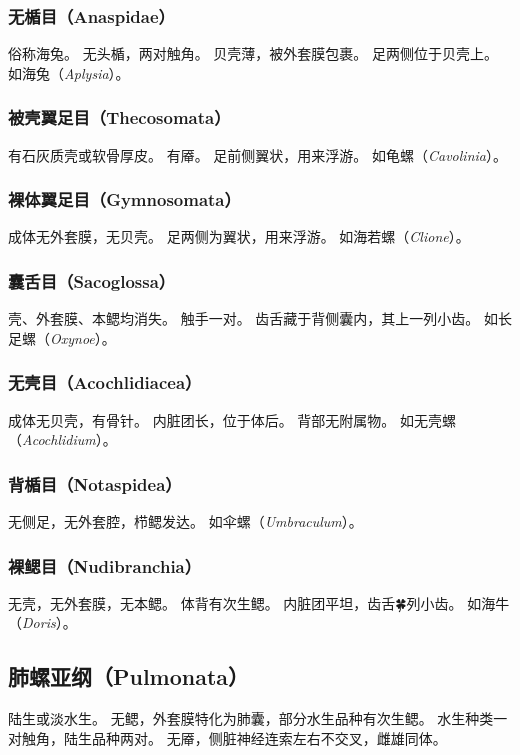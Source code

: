 \documentclass[11pt]{article}
\begin{document}
\subsubsection{无楯目（Anaspidae）}
俗称海兔。
无头楯，两对触角。
贝壳薄，被外套膜包裹。
足两侧位于贝壳上。
如海兔（\textit{Aplysia}）。

\subsubsection{被壳翼足目（Thecosomata）}
有石灰质壳或软骨厚皮。
有厣。
足前侧翼状，用来浮游。
如龟螺（\textit{Cavolinia}）。

\subsubsection{裸体翼足目（Gymnosomata）}
成体无外套膜，无贝壳。
足两侧为翼状，用来浮游。
如海若螺（\textit{Clione}）。

\subsubsection{囊舌目（Sacoglossa）}
壳、外套膜、本鳃均消失。
触手一对。
齿舌藏于背侧囊内，其上一列小齿。
如长足螺（\textit{Oxynoe}）。

\subsubsection{无壳目（Acochlidiacea）}
成体无贝壳，有骨针。
内脏团长，位于体后。
背部无附属物。
如无壳螺（\textit{Acochlidium}）。

\subsubsection{背楯目（Notaspidea）}
无侧足，无外套腔，栉鳃发达。
如伞螺（\textit{Umbraculum}）。

\subsubsection{裸鳃目（Nudibranchia）}
无壳，无外套膜，无本鳃。
体背有次生鳃。
内脏团平坦，齿舌🍀列小齿。
如海牛（\textit{Doris}）。

\subsection{肺螺亚纲（Pulmonata）}
陆生或淡水生。
无鳃，外套膜特化为肺囊，部分水生品种有次生鳃。
水生种类一对触角，陆生品种两对。
无厣，侧脏神经连索左右不交叉，雌雄同体。
\end{document}

